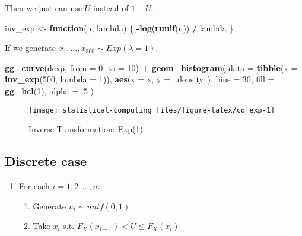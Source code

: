\documentclass[]{book}
\newenvironment{Shaded}{\begin{snugshade}}{\end{snugshade}}
\newcommand{\KeywordTok}[1]{\textcolor[rgb]{0.13,0.29,0.53}{\textbf{#1}}}
\newcommand{\DataTypeTok}[1]{\textcolor[rgb]{0.13,0.29,0.53}{#1}}
\newcommand{\DecValTok}[1]{\textcolor[rgb]{0.00,0.00,0.81}{#1}}
\newcommand{\StringTok}[1]{\textcolor[rgb]{0.31,0.60,0.02}{#1}}
\newcommand{\ControlFlowTok}[1]{\textcolor[rgb]{0.13,0.29,0.53}{\textbf{#1}}}
\newcommand{\OperatorTok}[1]{\textcolor[rgb]{0.81,0.36,0.00}{\textbf{#1}}}
\newcommand{\NormalTok}[1]{#1}
\providecommand{\tightlist}{%
  \setlength{\itemsep}{0pt}\setlength{\parskip}{0pt}}
\theoremstyle{definition}
\theoremstyle{definition}
\theoremstyle{definition}
\theoremstyle{remark}
\begin{document}
Then we just can use \(U\) instead of \(1 - U\).

\begin{Shaded}
\begin{Highlighting}[]
\NormalTok{inv_exp <-}\StringTok{ }\ControlFlowTok{function}\NormalTok{(n, lambda) \{}
  \OperatorTok{-}\KeywordTok{log}\NormalTok{(}\KeywordTok{runif}\NormalTok{(n)) }\OperatorTok{/}\StringTok{ }\NormalTok{lambda}
\NormalTok{\}}
\end{Highlighting}
\end{Shaded}

If we generate \(x_1, \ldots, x_{500} \sim Exp(\lambda = 1)\),

\begin{Shaded}
\begin{Highlighting}[]
\KeywordTok{gg_curve}\NormalTok{(dexp, }\DataTypeTok{from =} \DecValTok{0}\NormalTok{, }\DataTypeTok{to =} \DecValTok{10}\NormalTok{) }\OperatorTok{+}
\StringTok{  }\KeywordTok{geom_histogram}\NormalTok{(}
    \DataTypeTok{data =} \KeywordTok{tibble}\NormalTok{(}\DataTypeTok{x =} \KeywordTok{inv_exp}\NormalTok{(}\DecValTok{500}\NormalTok{, }\DataTypeTok{lambda =} \DecValTok{1}\NormalTok{)),}
    \KeywordTok{aes}\NormalTok{(}\DataTypeTok{x =}\NormalTok{ x, }\DataTypeTok{y =}\NormalTok{ ..density..),}
    \DataTypeTok{bins =} \DecValTok{30}\NormalTok{,}
    \DataTypeTok{fill =} \KeywordTok{gg_hcl}\NormalTok{(}\DecValTok{1}\NormalTok{),}
    \DataTypeTok{alpha =}\NormalTok{ .}\DecValTok{5}
\NormalTok{  )}
\end{Highlighting}
\end{Shaded}

\begin{figure}[H]

{\centering \texttt{[image: statistical-computing\_files/figure-latex/cdfexp-1]} 

}

\caption{Inverse Transformation: Exp(1)}\label{fig:cdfexp}
\end{figure}

\subsection{Discrete case}\label{discrete-case}

\begin{enumerate}
\def\labelenumi{\arabic{enumi}.}
\tightlist
\item
  For each \(i = 1, 2, \ldots, n\):

  \begin{enumerate}
  \def\labelenumii{\alph{enumii}.}
  \tightlist
  \item
    Generate \(u_i \sim unif(0, 1)\)
  \item
    Take \(x_i\) s.t. \(F_X(x_{i - 1}) < U \le F_X(x_i)\)
  \end{enumerate}
\end{enumerate}
\end{document}
